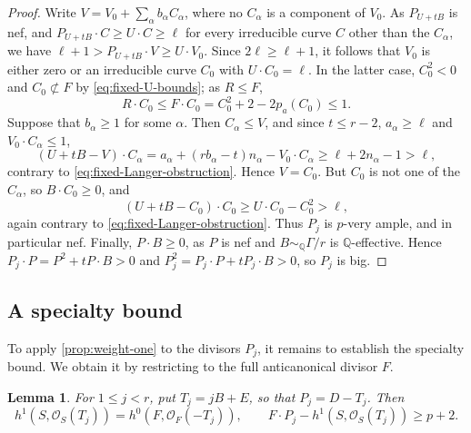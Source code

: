 \documentclass[11pt,reqno]{amsart}
\numberwithin{equation}{section}
\newtheorem{lemma}[lemma]{Lemma}
\theoremstyle{remark}
\newcommand{\sshf}[1]{\mathcal{O}_{#1}}
\newcommand{\pa}{p_a}
\begin{document}
\begin{proof}
Write \(V=V_0+\sum_\alpha b_\alpha C_\alpha\), where no \(C_\alpha\) is a component of \(V_0\). As \(P_{U+tB}\) is nef, and \(P_{U+tB}\cdot C\geq U\cdot C\geq\ell\) for every irreducible curve \(C\) other than the \(C_\alpha\), we have \(\ell+1>P_{U+tB}\cdot V\geq U\cdot V_0\). Since \(2\ell\geq\ell+1\), it follows that \(V_0\) is either zero or an irreducible curve \(C_0\) with \(U\cdot C_0=\ell\). In the latter case, \(C_0^2<0\) and \(C_0\not\subset F\) by \eqref{eq:fixed-U-bounds}; as \(R\leq F\),
\[
 R\cdot C_0\leq F\cdot C_0=C_0^2+2-2\pa(C_0)\leq1.
\]
Suppose that \(b_\alpha\geq1\) for some \(\alpha\). Then \(C_\alpha\leq V\), and since \(t\leq r-2\), \(a_\alpha\geq\ell\) and \(V_0\cdot C_\alpha\leq1\),
\[
 (U+tB-V)\cdot C_\alpha
 =a_\alpha+(rb_\alpha-t)n_\alpha-V_0\cdot C_\alpha
 \geq\ell+2n_\alpha-1>\ell,
\]
contrary to \eqref{eq:fixed-Langer-obstruction}. Hence \(V=C_0\). But \(C_0\) is not one of the \(C_\alpha\), so \(B\cdot C_0\geq0\), and
\[
 (U+tB-C_0)\cdot C_0\geq U\cdot C_0-C_0^2>\ell,
\]
again contrary to \eqref{eq:fixed-Langer-obstruction}. Thus \(P_j\) is \(p\)-very ample, and in particular nef. Finally, \(P\cdot B\geq0\), as \(P\) is nef and \(B\sim_{\mathbb Q}\Gamma/r\) is \(\mathbb Q\)-effective. Hence \(P_j\cdot P=P^2+tP\cdot B>0\) and \(P_j^2=P_j\cdot P+tP_j\cdot B>0\), so \(P_j\) is big.
\end{proof}

\subsection{A specialty bound}\label{sec:fixed-specialty}

To apply \cref{prop:weight-one} to the divisors $P_j$, it remains to establish the specialty bound. We obtain it by restricting to the full anticanonical divisor $F$.

\begin{lemma}
\label{lem:fixed-augmented-specialty}
For \(1\leq j<r\), put \(T_j=jB+E\), so that \(P_j=D-T_j\). Then
\begin{equation*}
 h^1(S,\sshf{S}(T_j))=h^0(F,\sshf{F}(-T_j)),\qquad
 F\cdot P_j-h^1(S,\sshf{S}(T_j))\geq p+2.
\end{equation*}
\end{lemma}
\end{document}
